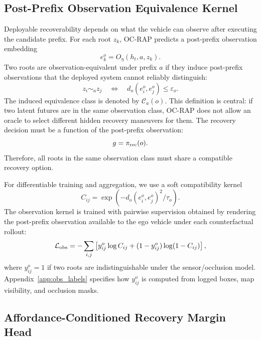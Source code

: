 \documentclass[conference]{IEEEtran}
\begin{document}
\subsection{Post-Prefix Observation Equivalence Kernel}
\label{subsec:obs_kernel}

Deployable recoverability depends on what the vehicle can observe after executing the candidate prefix.  For each root $z_k$, OC-RAP predicts a post-prefix observation embedding
\begin{equation}
    e_k^o = O_\eta(h_t,a,z_k).
\end{equation}
Two roots are observation-equivalent under prefix $a$ if they induce post-prefix observations that the deployed system cannot reliably distinguish:
\begin{equation}
    z_i \sim_a z_j
    \quad \Longleftrightarrow \quad
    d_o(e_i^o,e_j^o)\leq \varepsilon_o.
    \label{eq:obs_equiv}
\end{equation}
The induced equivalence class is denoted by $\mathcal{C}_a(o)$.  This definition is central: if two latent futures are in the same observation class, OC-RAP does not allow an oracle to select different hidden recovery maneuvers for them.  The recovery decision must be a function of the post-prefix observation:
\begin{equation}
    g = \pi_{\rm rec}(o).
\end{equation}
Therefore, all roots in the same observation class must share a compatible recovery option.

For differentiable training and aggregation, we use a soft compatibility kernel
\begin{equation}
    C_{ij}
    =
    \exp\!\left(-d_o(e_i^o,e_j^o)^2/\tau_o\right).
    \label{eq:compatibility}
\end{equation}
The observation kernel is trained with pairwise supervision obtained by rendering the post-prefix observation available to the ego vehicle under each counterfactual rollout:
\begin{equation}
    \mathcal{L}_{\rm obs}
    =
    - \sum_{i,j}
    \left[
        y_{ij}^{o}\log C_{ij}
        +
        (1-y_{ij}^{o})\log(1-C_{ij})
    \right],
    \label{eq:obs_loss}
\end{equation}
where $y_{ij}^{o}=1$ if two roots are indistinguishable under the sensor/occlusion model.  Appendix~\ref{app:obs_labels} specifies how $y_{ij}^{o}$ is computed from logged boxes, map visibility, and occlusion masks.

\subsection{Affordance-Conditioned Recovery Margin Head}
\label{subsec:recovery_margin}
\end{document}
